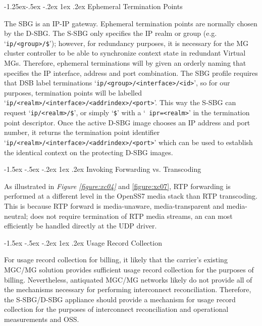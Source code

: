 \documentclass[letterpaper,final,notitlepage,twocolumn,10pt,twoside]{article}
\makeatletter
\let\normalsize = \small
\let\small = \footnotesize
\let\footnotesize = \scriptsize
\let\scriptsize = \tiny
\renewcommand\subsection{\@startsection{subsection}{2}{\z@}%
                                     {-1.5ex \@plus -.5ex \@minus -.2ex}%
                                     {1ex \@plus .2ex}%
                                     {\normalfont\normalsize\bfseries}}
\renewcommand\subsubsection{\@startsection{subsubsection}{3}{\z@}%
                                     {-1.25ex\@plus -.5ex \@minus -.2ex}%
                                     {1ex \@plus .2ex}%
                                     {\normalfont\normalsize\bfseries}}
\makeatother
\begin{document}
\subsubsection{Ephemeral Termination Points}

The SBG is an IP-IP gateway.  Ephemeral termination points are normally chosen
by the D-SBG.  The S-SBG only specifies the IP realm or group (e.g.
`{\tt ip/<group>/\$}'); however, for redundancy purposes, it is necessary for
the MG cluster controller to be able to synchronize context state in redundant
Virtual MGs.  Therefore, ephemeral terminations will by given an orderly
naming that specifies the IP interface, address and port combination.  The SBG
profile requires that DSB label terminations
`{\tt ip/<group>/<interface>/<id>}', so for our purposes, termination points
will be labelled `{\tt ip/<realm>/<interface>/<addrindex>/<port>}'.  This way
the S-SBG can request `{\tt ip/<realm>/\$}', or simply `{\tt \$}' with a `{\tt
ipr=<realm>}' in the termination point descriptor.  Once the active D-SBG
image chooses an IP address and port number, it returns the termination point
identifier `{\tt ip/<realm>/<interface>/<addrindex>/<port>}' which can be used
to establish the identical context on the protecting D-SBG images.

\subsection{Invoking Forwarding vs. Transcoding}

As illustrated in {\sl Figure \ref{figure:xc04}} and {\ref{figure:xc07}}, RTP
forwarding is performed at a different level in the OpenSS7 media stack than
RTP transcoding.  This is because RTP forward is media-unaware,
media-transparent and media-neutral; does not require termination of RTP
media streams, an can most efficiently be handled directly at the UDP driver.

\subsection{Usage Record Collection}

For usage record collection for billing, it likely that the carrier's existing
MGC/MG solution provides sufficient usage record collection for the purposes of
billing.  Nevertheless, antiquated MGC/MG networks likely do not provide all of
the mechanisms necessary for performing interconnect reconciliation.  Therefore,
the S-SBG/D-SBG appliance should provide a mechanism for usage record collection
for the purposes of interconnect reconciliation and operational measurements and
OSS.
\end{document}
